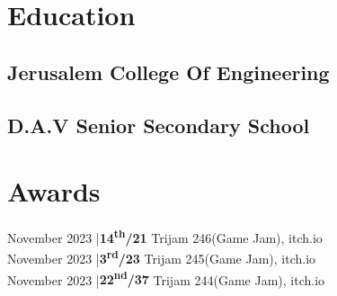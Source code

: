 \documentclass[]{deedy-resume-openfont}
\begin{document}
\begin{minipage}[t]{0.33\textwidth}
\section{Education} 

\subsection{Jerusalem College Of Engineering}
\sectionsep

\subsection{D.A.V Senior Secondary School}
\sectionsep


\section{Awards}
\vspace{\topsep} %
November 2023 |{\bf 14\textsuperscript{th}/21} Trijam 246(Game Jam), itch.io\\
November 2023 |{\bf 3\textsuperscript{rd}/23}  Trijam 245(Game Jam), itch.io\\
November 2023 |{\bf 22\textsuperscript{nd}/37} Trijam 244(Game Jam), itch.io\\
\sectionsep

%
%

\end{minipage} 
\hfill
\end{document}
